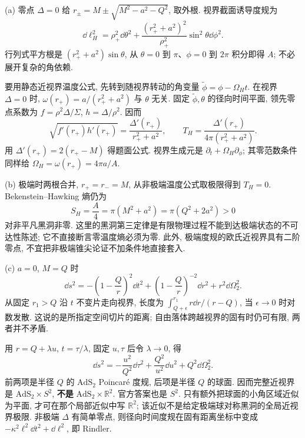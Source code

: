 \begin{solution}
(a) 零点 $\Delta=0$ 给 $r_\pm=M\pm\sqrt{M^2-a^2-Q^2}$, 取外根. 视界截面诱导度规为
\[
\dd\ell_H^2=\rho_+^2\dd\theta^2+
\frac{(r_+^2+a^2)^2}{\rho_+^2}\sin^2\theta\dd\phi^2.
\]
行列式平方根是 $(r_+^2+a^2)\sin\theta$, 从 $\theta=0$ 到 $\pi$、$\phi=0$ 到 $2\pi$ 积分即得 $A$; 不必展开复杂的角依赖.

要用静态近视界温度公式, 先转到随视界转动的角变量 $\widetilde\phi=\phi-\Omega_Ht$. 在视界 $\Delta=0$ 时, $\omega(r_+)=a/(r_+^2+a^2)$ 与 $\theta$ 无关. 固定 $\widetilde\phi,\theta$ 的径向时间平面, 领先零点系数为 $f=\rho^2\Delta/\Sigma$, $h=\Delta/\rho^2$. 因而
\[
\sqrt{f'(r_+)h'(r_+)}
=\frac{\Delta'(r_+)}{r_+^2+a^2},\qquad
T_H=\frac{\Delta'(r_+)}{4\pi(r_+^2+a^2)}.
\]
用 $\Delta'(r_+)=2(r_+-M)$ 得题面公式. 视界生成元是 $\partial_t+\Omega_H\partial_\phi$; 其零范数条件同样给 $\Omega_H=\omega(r_+)=4\pi a/A$.

(b) 极端时两根合并, $r_+=r_-=M$, 从非极端温度公式取极限得到 $T_H=0$. Bekenstein--Hawking 熵仍为
\[
S_H=\frac A4=\pi(M^2+a^2)=\pi(Q^2+2a^2)>0
\]
对非平凡黑洞非零. 这里的黑洞第三定律是有限物理过程不能到达极端状态的不可达性陈述; 它不直接断言零温度熵必须为零. 此外, 极端度规的欧氏近视界具有二阶零点, 不宜把非极端锥尖论证不加条件地直接套入.

(c) $a=0$, $M=Q$ 时
\[
\dd s^2=-\left(1-\frac Qr\right)^2\dd t^2
+\left(1-\frac Qr\right)^{-2}\dd r^2+r^2\dd\Omega_2^2.
\]
从固定 $r_1>Q$ 沿 $t$ 不变片走向视界, 长度为 $\int_{Q+\epsilon}^{r_1}r\dd r/(r-Q)$, 当 $\epsilon\to0$ 时对数发散. 这说的是所指定空间切片的距离; 自由落体跨越视界的固有时仍可有限, 两者并不矛盾.

用 $r=Q+\lambda u$, $t=\tau/\lambda$, 固定 $u,\tau$ 后令 $\lambda\to0$, 得
\[
\dd s^2=-\frac{u^2}{Q^2}\dd\tau^2+
\frac{Q^2}{u^2}\dd u^2+Q^2\dd\Omega_2^2.
\]
前两项是半径 $Q$ 的 $\mathrm{AdS}_2$ Poincaré 度规, 后项是半径 $Q$ 的球面. 因而完整近视界是 $\mathrm{AdS}_2\times S^2$, \textbf{不是} $\mathrm{AdS}_2\times\mathbb R^2$. 官方答案也是 $S^2$. 只有额外把球面的小角区域近似为平面, 才可在那个局部近似中写 $\mathbb R^2$; 该近似不是给定极端球对称黑洞的全局近视界极限. 非极端 $\Delta$ 有简单零点, 则径向时间度规在固有距离坐标中变成 $-\kappa^2\ell^2\dd t^2+\dd\ell^2$, 即 Rindler.
\end{solution}


